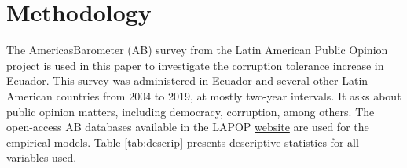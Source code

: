 \documentclass[12pt,a4]{article}\usepackage[]{graphicx}\usepackage[]{xcolor}
\begin{document}




\section{Methodology}
\label{sec:methodology} %

The AmericasBarometer (AB) survey from the Latin American Public Opinion project is used in this paper to investigate the corruption tolerance increase in Ecuador. This survey was administered in Ecuador and several other Latin American countries from 2004 to 2019, at mostly two-year intervals. It asks about public opinion matters, including democracy, corruption, among others. The open-access AB databases available in the LAPOP \href{https://www.vanderbilt.edu/lapop/data-access.php}{website} are used for the empirical models. Table \ref{tab:descrip} presents descriptive statistics for all variables used.
\end{document}
